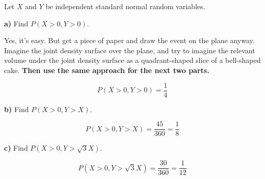 \documentclass[11pt]{article}
\begin{document}
Let \(X\) and \(Y\) be independent standard normal random variables.

\textbf{a)} Find \(P(X > 0, Y > 0)\).

Yes, it's easy. But get a piece of paper and draw the event on the plane
anyway. Imagine the joint density surface over the plane, and try to
imagine the relevant volume under the joint density surface as a
quadrant-shaped slice of a bell-shaped cake. \textbf{Then use the same
approach for the next two parts.}

\[
P(X > 0, Y > 0) = \frac{1}{4}
\]
\begin{centering}
	

\end{centering}

\textbf{b)} Find \(P(X > 0, Y > X)\).


\[
P(X > 0, Y > X) = \frac{45}{360} = \frac{1}{8}
\]

\begin{centering}
	

\end{centering}








\textbf{c)} Find \(P(X > 0, Y > \sqrt{3}X)\).

\[
	P(X > 0, Y > \sqrt{3}X ) = \frac{30}{360} = \frac{1}{12}
\]
\end{document}
